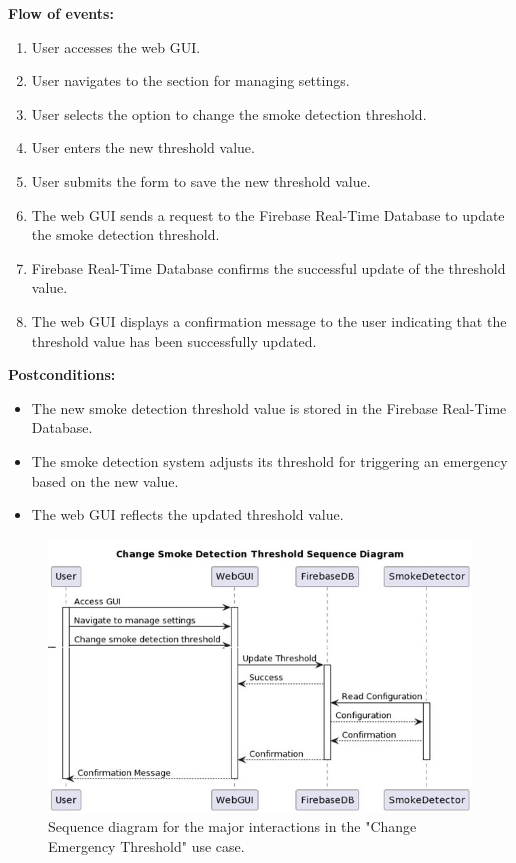 \textbf{Flow of events:}
\begin{enumerate}
    \item User accesses the web GUI.
    \item User navigates to the section for managing settings.
    \item User selects the option to change the smoke detection threshold.
    \item User enters the new threshold value.
    \item User submits the form to save the new threshold value.
    \item The web GUI sends a request to the Firebase Real-Time Database to update the smoke detection threshold.
    \item Firebase Real-Time Database confirms the successful update of the threshold value.
    \item The web GUI displays a confirmation message to the user indicating that the threshold value has been successfully
          updated.
\end{enumerate}

\textbf{Postconditions:}
\begin{itemize}
    \item The new smoke detection threshold value is stored in the Firebase Real-Time Database.
    \item The smoke detection system adjusts its threshold for triggering an emergency based on the new value.
    \item The web GUI reflects the updated threshold value.
\end{itemize}

\begin{figure}[H]
    \centering
    \includegraphics[width=\linewidth]{../assets/ChangeSmokeDetection.jpg}
    \caption{Sequence diagram for the major interactions in the "Change Emergency Threshold" use case.}
\end{figure}

